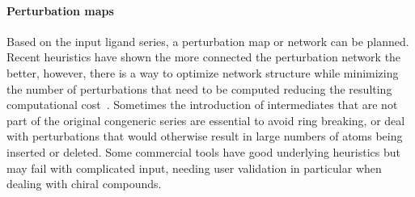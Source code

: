 \documentclass[9pt,bestpractices]{livecoms}
\begin{document}
\paragraph{Perturbation maps}
Based on the input ligand series, a perturbation map or network can be planned. Recent heuristics have shown the more connected the perturbation network the better, however, there is a way to optimize network structure while minimizing the number of perturbations that need to be computed reducing the resulting computational cost~\cite{yang2020optimal,xu2019optimal}. Sometimes the introduction of intermediates that are not part of the original congeneric series are essential to avoid ring breaking, or deal with perturbations that would otherwise result in large numbers of atoms being inserted or deleted. Some commercial tools have good underlying heuristics but may fail with complicated input, needing user validation in particular when dealing with chiral compounds. 
\end{document}
